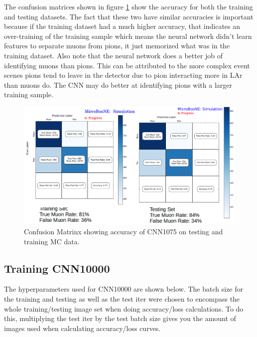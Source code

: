 The confusion matrices shown in figure \ref{fig:confusion1075} show the accuracy for both the training and testing datasets. The fact that these two have similar accuracies is important because if the training dataset had a much higher accuracy, that indicates an over-training of the training sample which means the neural network didn't learn features to separate muons from pions, it just memorized what was in the training dataset. Also note that the neural network does a better job of identifying muons than pions. This can be attributed to the more complex event scenes pions tend to leave in the detector due to pion interacting more in LAr than muons do. The CNN may do better at identifying pions with a larger training sample.
\begin{figure}[htp!]
\centering
\includegraphics[scale=.6]{figs/confusion1.png}
\caption{Confusion Matrinx showing accuracy of CNN1075 on testing and training MC data.} 
\label{fig:confusion1075}

\end{figure}
\subsection{Training CNN10000}
The hyperparameters used for CNN10000 are shown below. The batch size for the training and testing as well as the test iter were chosen to encompass the whole training/testing image set when doing accuracy/loss calculations. To do this, multiplying the test iter by the test batch size gives you the amount of images used when calculating accuracy/loss curves. 

